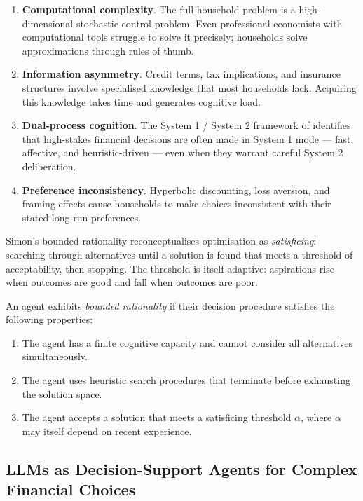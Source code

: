 \begin{context}
\begin{enumerate}
  \item \textbf{Computational complexity}. The full household problem is a high-dimensional stochastic control problem. Even professional economists with computational tools struggle to solve it precisely; households solve approximations through rules of thumb.
  \item \textbf{Information asymmetry}. Credit terms, tax implications, and insurance structures involve specialised knowledge that most households lack. Acquiring this knowledge takes time and generates cognitive load.
  \item \textbf{Dual-process cognition}. The System 1 / System 2 framework of \citet{kahneman2011thinking} identifies that high-stakes financial decisions are often made in System 1 mode --- fast, affective, and heuristic-driven --- even when they warrant careful System 2 deliberation.
  \item \textbf{Preference inconsistency}. Hyperbolic discounting, loss aversion, and framing effects cause households to make choices inconsistent with their stated long-run preferences.
\end{enumerate}

Simon's bounded rationality reconceptualises optimisation as \emph{satisficing}: searching through alternatives until a solution is found that meets a threshold of acceptability, then stopping. The threshold is itself adaptive: aspirations rise when outcomes are good and fall when outcomes are poor.

\begin{definition}
\label{def:bounded-rationality}
An agent exhibits \emph{bounded rationality} if their decision procedure satisfies the following properties:
\begin{enumerate}
  \item[(i)] The agent has a finite cognitive capacity and cannot consider all alternatives simultaneously.
  \item[(ii)] The agent uses heuristic search procedures that terminate before exhausting the solution space.
  \item[(iii)] The agent accepts a solution that meets a satisficing threshold $\alpha$, where $\alpha$ may itself depend on recent experience.
\end{enumerate}
\end{definition}

\subsection{LLMs as Decision-Support Agents for Complex Financial Choices}
\label{subsec:decision-support}


\end{context}
